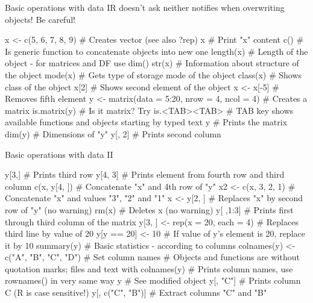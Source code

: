 \documentclass[compress, xelatex, 11pt, xcolor=svgnames, aspectratio=169, url={hyphens, lowtilde}]{beamer}
\begin{document}
\begin{frame}[fragile]{Basic operations with data I}{\alert{R doesn't ask neither notifies when overwriting objects! Be careful!}}
	\begin{spluscode}
    x <- c(5, 6, 7, 8, 9) # Creates vector (see also ?rep)
    x # Print "x" content
    c() # Is generic function to concatenate objects into new one
    length(x) # Length of the object - for matrices and DF use dim()
    str(x) # Information about structure of the object
    mode(x) # Gets type of storage mode of the object
    class(x) # Shows class of the object
    x[2] # Shows second element of the object
    x <- x[-5] # Removes fifth element
    y <- matrix(data = 5:20, nrow = 4, ncol = 4) # Creates a matrix
    is.matrix(y) # Is it matrix? Try is.<TAB><TAB>
    # TAB key shows available functions and objects starting by typed text
    y # Prints the matrix
    dim(y) # Dimensions of "y"
    y[, 2] # Prints second column
	\end{spluscode}
\end{frame}

\begin{frame}[fragile]{Basic operations with data II}
	\begin{spluscode}
    y[3,] # Prints third row
    y[4, 3] # Prints element from fourth row and third column
    c(x, y[4, ]) # Concatenate "x" and 4th row of "y"
    x2 <- c(x, 3, 2, 1) # Concatenate "x" and values "3", "2" and "1"
    x <- y[2, ] # Replaces "x" by second row of "y" (no warning)
    rm(x) # Deletes x (no warning)
    y[ ,1:3] # Prints first through third column of the matrix
    y[3, ] <- rep(x = 20, each = 4) # Replaces third line by value of 20
    y[y == 20] <- 10 # If value of y's element is 20, replace it by 10
    summary(y) # Basic statistics - according to columns
    colnames(y) <- c("A", "B", "C", "D") # Set column names
    # Objects and functions are without quotation marks; files and text with
    colnames(y) # Prints column names, use rownames() in very same way
    y # See modified object
    y[, "C"] # Prints column C (R is case sensitive!)
    y[, c("C", "B")] # Extract columns "C" and "B"
	\end{spluscode}
\end{frame}
\end{document}
